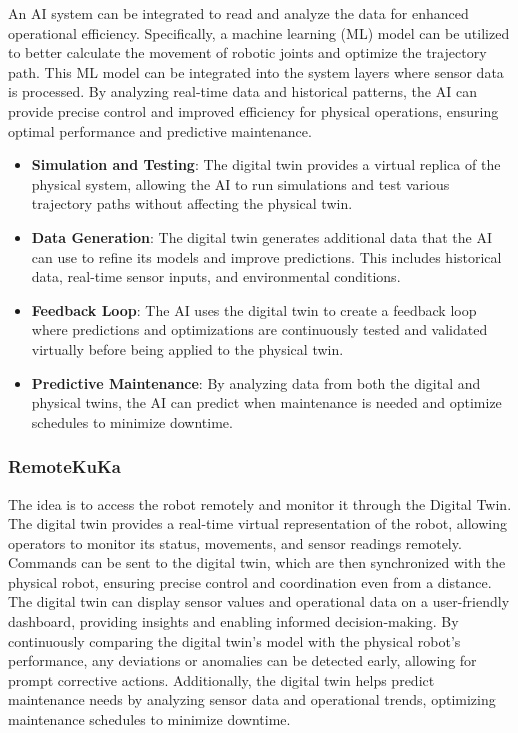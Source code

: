 An AI system can be integrated to read and analyze the data for enhanced
operational efficiency. Specifically, 
a machine learning (ML) model can be utilized to better calculate 
the movement of robotic joints and optimize the trajectory path. 
This ML model can be integrated into the system layers where sensor data is 
processed. By analyzing real-time data and historical patterns, 
the AI can provide precise control and improved efficiency for 
physical operations, ensuring optimal performance and predictive maintenance.

\begin{itemize}
    \item \textbf{Simulation and Testing}: The digital twin provides a virtual replica of the physical system, allowing the AI to run simulations and test various trajectory paths without affecting the physical twin.
    \item \textbf{Data Generation}: The digital twin generates additional data that the AI can use to refine its models and improve predictions. This includes historical data, real-time sensor inputs, and environmental conditions.
    \item \textbf{Feedback Loop}: The AI uses the digital twin to create a feedback loop where predictions and optimizations are continuously tested and validated virtually before being applied to the physical twin.
    \item \textbf{Predictive Maintenance}: By analyzing data from both the digital and physical twins, the AI can predict when maintenance is needed and optimize schedules to minimize downtime.
\end{itemize}


\subsubsection{RemoteKuKa}

The idea is to access the robot remotely and monitor it through the Digital Twin.
The digital twin provides a real-time virtual representation of the robot,
allowing operators to monitor its status, movements, and sensor readings 
remotely. Commands can be sent to the digital twin, which are then synchronized
with the physical robot, ensuring precise control and coordination even from a 
distance. The digital twin can display sensor values and operational data on a 
user-friendly dashboard, providing insights and enabling informed decision-making. By continuously comparing the digital twin's model with the physical robot's performance, any deviations or anomalies can be detected early, allowing for prompt corrective actions. Additionally, the digital twin helps predict maintenance needs by analyzing sensor data and operational 
trends, optimizing maintenance schedules to minimize downtime.

